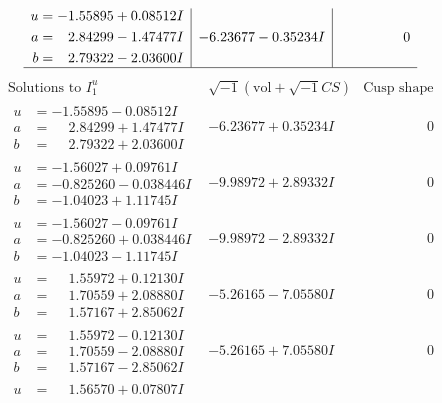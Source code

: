 \documentclass[1p]{elsarticle_modified}
\theoremstyle{definition}
\newcommand{\I}{\sqrt{-1}}
\begin{document}
$$\begin{array}{c|c|c}
\begin{aligned}
u &= -1.55895 + 0.08512 I \\
a &= \phantom{-}2.84299 - 1.47477 I \\
b &= \phantom{-}2.79322 - 2.03600 I\end{aligned}
 & -6.23677 - 0.35234 I & \phantom{-0.000000 } 0\\
 \hline 
 \end{array}$$\newpage$$\begin{array}{c|c|c}  
\text{Solutions to }I^u_{1}& \I (\text{vol} + \sqrt{-1}CS) & \text{Cusp shape}\\
 \hline 
\begin{aligned}
u &= -1.55895 - 0.08512 I \\
a &= \phantom{-}2.84299 + 1.47477 I \\
b &= \phantom{-}2.79322 + 2.03600 I\end{aligned}
 & -6.23677 + 0.35234 I & \phantom{-0.000000 } 0 \\ \hline\begin{aligned}
u &= -1.56027 + 0.09761 I \\
a &= -0.825260 - 0.038446 I \\
b &= -1.04023 + 1.11745 I\end{aligned}
 & -9.98972 + 2.89332 I & \phantom{-0.000000 } 0 \\ \hline\begin{aligned}
u &= -1.56027 - 0.09761 I \\
a &= -0.825260 + 0.038446 I \\
b &= -1.04023 - 1.11745 I\end{aligned}
 & -9.98972 - 2.89332 I & \phantom{-0.000000 } 0 \\ \hline\begin{aligned}
u &= \phantom{-}1.55972 + 0.12130 I \\
a &= \phantom{-}1.70559 + 2.08880 I \\
b &= \phantom{-}1.57167 + 2.85062 I\end{aligned}
 & -5.26165 - 7.05580 I & \phantom{-0.000000 } 0 \\ \hline\begin{aligned}
u &= \phantom{-}1.55972 - 0.12130 I \\
a &= \phantom{-}1.70559 - 2.08880 I \\
b &= \phantom{-}1.57167 - 2.85062 I\end{aligned}
 & -5.26165 + 7.05580 I & \phantom{-0.000000 } 0 \\ \hline\begin{aligned}
u &= \phantom{-}1.56570 + 0.07807 I \\

\end{aligned}
\end{array}$$
\end{document}
